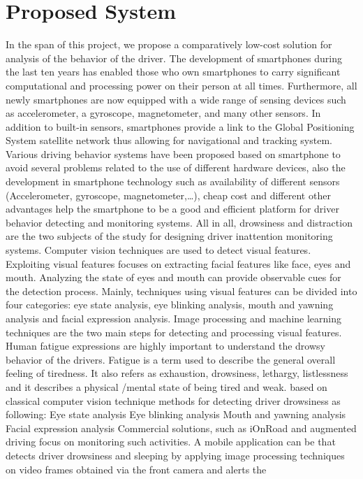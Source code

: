 \chapter{Proposed System}
In the span of this project, we propose a comparatively low-cost solution for analysis of the
behavior of the driver. The development of smartphones during the last ten years has enabled
those who own smartphones to carry significant computational and processing power on their
person at all times. Furthermore, all newly smartphones are now equipped with a wide range of
sensing devices such as accelerometer, a gyroscope, magnetometer, and many other sensors.
In addition to built-in sensors, smartphones provide a link to the Global Positioning System
satellite network thus allowing for navigational and tracking system. Various driving behavior
systems have been proposed based on smartphone to avoid several problems related to the
use of different hardware devices, also the development in smartphone technology such as
availability of different sensors (Accelerometer, gyroscope, magnetometer,…), cheap cost and
different other advantages help the smartphone to be a good and efficient platform for driver
behavior detecting and monitoring systems.
All in all, drowsiness and distraction are the two subjects of the study for designing driver
inattention monitoring systems. Computer vision techniques are used to detect visual features.
Exploiting visual features focuses on extracting facial features like face, eyes and mouth.
Analyzing the state of eyes and mouth can provide observable cues for the detection process.
Mainly, techniques using visual features can be divided into four categories: eye state analysis,
eye blinking analysis, mouth and yawning analysis and facial expression analysis. Image
processing and machine learning techniques are the two main steps for detecting and
processing visual features.
Human fatigue expressions are highly important to understand the drowsy behavior of the
drivers. Fatigue is a term used to describe the general overall feeling of tiredness. It also refers
as exhaustion, drowsiness, lethargy, listlessness and it describes a physical /mental state of
being tired and weak. based on classical computer vision technique methods for detecting driver
drowsiness as following:
Eye state analysis
Eye blinking analysis
Mouth and yawning analysis
Facial expression analysis
Commercial solutions, such as iOnRoad and augmented driving focus on monitoring such
activities. A mobile application can be that detects driver drowsiness and sleeping by applying
image processing techniques on video frames obtained via the front camera and alerts the
